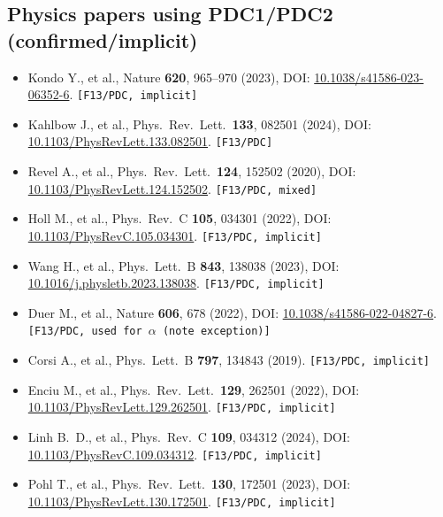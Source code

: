 \documentclass[a4paper, 11pt]{article}
\begin{document}
\subsection{Physics papers using PDC1/PDC2 (confirmed/implicit)}
\begin{itemize}
  \item Kondo Y., et al., Nature \textbf{620}, 965--970 (2023), DOI: \href{https://doi.org/10.1038/s41586-023-06352-6}{10.1038/s41586-023-06352-6}. \texttt{[F13/PDC, implicit]}
  \item Kahlbow J., et al., Phys.\ Rev.\ Lett.\ \textbf{133}, 082501 (2024), DOI: \href{https://doi.org/10.1103/PhysRevLett.133.082501}{10.1103/PhysRevLett.133.082501}. \texttt{[F13/PDC]}
  \item Revel A., et al., Phys.\ Rev.\ Lett.\ \textbf{124}, 152502 (2020), DOI: \href{https://doi.org/10.1103/PhysRevLett.124.152502}{10.1103/PhysRevLett.124.152502}. \texttt{[F13/PDC, mixed]}
  \item Holl M., et al., Phys.\ Rev.\ C \textbf{105}, 034301 (2022), DOI: \href{https://doi.org/10.1103/PhysRevC.105.034301}{10.1103/PhysRevC.105.034301}. \texttt{[F13/PDC, implicit]}
  \item Wang H., et al., Phys.\ Lett.\ B \textbf{843}, 138038 (2023), DOI: \href{https://doi.org/10.1016/j.physletb.2023.138038}{10.1016/j.physletb.2023.138038}. \texttt{[F13/PDC, implicit]}
  \item Duer M., et al., Nature \textbf{606}, 678 (2022), DOI: \href{https://doi.org/10.1038/s41586-022-04827-6}{10.1038/s41586-022-04827-6}. \texttt{[F13/PDC, used for $\alpha$ (note exception)]}
  \item Corsi A., et al., Phys.\ Lett.\ B \textbf{797}, 134843 (2019). \texttt{[F13/PDC, implicit]}
  \item Enciu M., et al., Phys.\ Rev.\ Lett.\ \textbf{129}, 262501 (2022), DOI: \href{https://doi.org/10.1103/PhysRevLett.129.262501}{10.1103/PhysRevLett.129.262501}. \texttt{[F13/PDC, implicit]}
  \item Linh B.\ D., et al., Phys.\ Rev.\ C \textbf{109}, 034312 (2024), DOI: \href{https://doi.org/10.1103/PhysRevC.109.034312}{10.1103/PhysRevC.109.034312}. \texttt{[F13/PDC, implicit]}
  \item Pohl T., et al., Phys.\ Rev.\ Lett.\ \textbf{130}, 172501 (2023), DOI: \href{https://doi.org/10.1103/PhysRevLett.130.172501}{10.1103/PhysRevLett.130.172501}. \texttt{[F13/PDC, implicit]}
\end{itemize}
\end{document}
